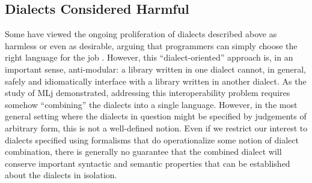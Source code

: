 \subsection{Dialects Considered Harmful}
Some have viewed the ongoing proliferation of dialects described above as harmless or even as desirable, arguing that programmers can simply choose the right language for the job \cite{journals/stp/Ward94}. However, this ``dialect-oriented'' approach is, in an important sense, anti-modular: a library written in one dialect cannot, in general, safely and idiomatically interface with a library written in another dialect. 
As the study of MLj demonstrated, addressing this interoperability problem requires somehow ``combining'' the  dialects into a single language. However, in the most general setting where the dialects in question might be specified by judgements of arbitrary form, this is not a well-defined notion. Even if we restrict our interest to dialects specified using formalisms that do operationalize some notion of dialect combination, there is generally no guarantee that the combined dialect will conserve important syntactic and semantic properties that can be established about the dialects in isolation. %
